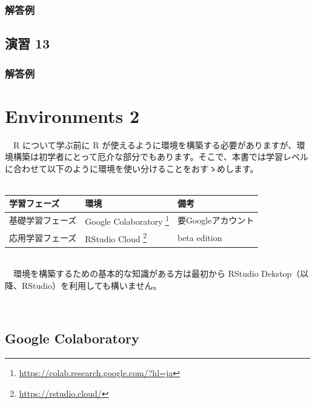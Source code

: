 \documentclass[
  12pt,
]{book}
\DeclareRobustCommand{\href}[2]{#2\footnote{\url{#1}}}
\begin{document}
\hypertarget{ux89e3ux7b54ux4f8b-11}{%
\subsection*{解答例}\label{ux89e3ux7b54ux4f8b-11}}

\hypertarget{ux6f14ux7fd2-13-2}{%
\section*{演習 13}\label{ux6f14ux7fd2-13-2}}

\hypertarget{ux89e3ux7b54ux4f8b-12}{%
\subsection*{解答例}\label{ux89e3ux7b54ux4f8b-12}}

\hypertarget{environments-2}{%
\chapter{Environments 2}\label{environments-2}}

　R について学ぶ前に R が使えるように環境を構築する必要がありますが、環境構築は初学者にとって厄介な部分でもあります。そこで、本書では学習レベルに合わせて以下のように環境を使い分けることをおすゝめします。\\
　

\begin{longtable}[]{@{}lll@{}}
\toprule
学習フェーズ & 環境 & 備考 \\
\midrule
\endhead
基礎学習フェーズ & \href{https://colab.research.google.com/?hl=ja}{Google Colaboratory } & 要Googleアカウント \\
応用学習フェーズ & \href{https://rstudio.cloud/}{RStudio Cloud } & beta edition \\
\bottomrule
\end{longtable}

　\\
　環境を構築するための基本的な知識がある方は最初から RStudio Dekstop（以降、RStudio）を利用しても構いません。

　

\hypertarget{google-colaboratory}{%
\section{Google Colaboratory}\label{google-colaboratory}}
\end{document}
